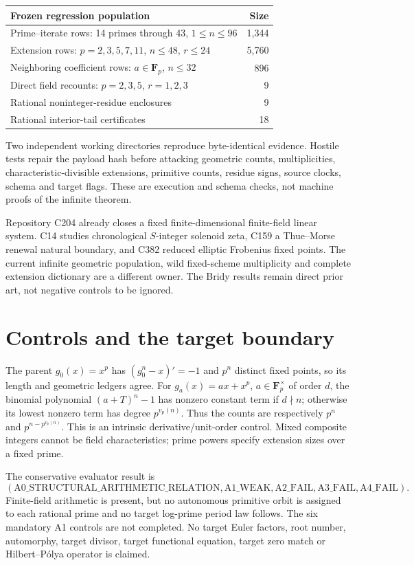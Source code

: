 \documentclass[10pt]{article}
\newcommand{\F}{\mathbf F}
\begin{document}
\begin{center}
\begin{tabular}{lr}
\toprule
Frozen regression population & Size\\
\midrule
Prime--iterate rows: 14 primes through 43, $1\le n\le96$ & 1,344\\
Extension rows: $p=2,3,5,7,11$, $n\le48$, $r\le24$ & 5,760\\
Neighboring coefficient rows: $a\in\F_p$, $n\le32$ & 896\\
Direct field recounts: $p=2,3,5$, $r=1,2,3$ & 9\\
Rational noninteger-residue enclosures & 9\\
Rational interior-tail certificates & 18\\
\bottomrule
\end{tabular}
\end{center}
Two independent working directories reproduce byte-identical evidence.
Hostile tests repair the payload hash before attacking geometric counts,
multiplicities, characteristic-divisible extensions, primitive counts,
residue signs, source clocks, schema and target flags. These are execution
and schema checks, not machine proofs of the infinite theorem.

Repository C204 already closes a fixed finite-dimensional finite-field
linear system. C14 studies chronological $S$-integer solenoid zeta, C159 a
Thue--Morse renewal natural boundary, and C382 reduced elliptic Frobenius
fixed points. The current infinite geometric population, wild fixed-scheme
multiplicity and complete extension dictionary are a different owner.
The Bridy results remain direct prior art, not negative controls to be ignored.
\fi

\section{Controls and the target boundary}
The parent $g_0(x)=x^p$ has $(g_0^n-x)'=-1$ and $p^n$ distinct fixed
points, so its length and geometric ledgers agree. For
$g_a(x)=ax+x^p$, $a\in\F_p^\times$ of order $d$, the binomial polynomial
$(a+T)^n-1$ has nonzero constant term if $d\nmid n$; otherwise its lowest
nonzero term has degree $p^{v_p(n)}$. Thus the counts are respectively
$p^n$ and $p^{n-p^{v_p(n)}}$. This is an intrinsic derivative/unit-order
control. Mixed composite integers cannot be field characteristics;
prime powers specify extension sizes over a fixed prime.

The conservative evaluator result is
\[
 (\mathrm{A0\_STRUCTURAL\_ARITHMETIC\_RELATION},
 \mathrm{A1\_WEAK},\mathrm{A2\_FAIL},\mathrm{A3\_FAIL},\mathrm{A4\_FAIL}).
\]
Finite-field arithmetic is present, but no autonomous primitive orbit is
assigned to each rational prime and no target log-prime period law follows.
The six mandatory A1 controls are not completed. No target Euler factors,
root number, automorphy, target divisor, target functional equation, target
zero match or Hilbert--P\'olya operator is claimed.
\end{document}
